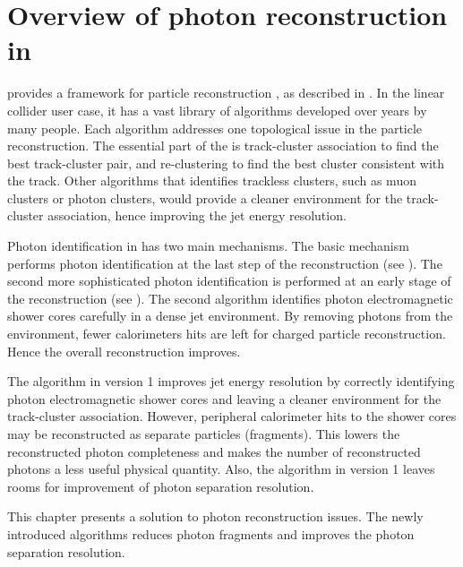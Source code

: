 
\section{Overview of photon reconstruction in \pandora}

\pandora provides a framework for particle reconstruction \cite{Marshall:2015rfa}, as described in . In the linear collider user case, it has a vast library of algorithms developed over years by many people. Each algorithm addresses one topological issue in the particle reconstruction. The essential part of the \pandora is track-cluster association  to find the best track-cluster pair, and re-clustering to find the best cluster consistent with the track. Other algorithms that identifies trackless clusters, such as muon clusters or photon clusters, would provide a cleaner environment for the track-cluster association, hence improving the jet energy resolution.

Photon identification in \pandora has two main mechanisms. The basic mechanism performs photon identification at the last step of the reconstruction  (see ). The second more sophisticated photon identification is performed at an early stage of the reconstruction  (see ). The second algorithm identifies photon electromagnetic shower cores carefully in a dense jet environment. By removing photons from the environment, fewer calorimeters hits are left for charged particle reconstruction. Hence the overall reconstruction improves.

The \PhotonReconstruction algorithm in \pandora version 1 improves jet energy resolution by correctly identifying photon electromagnetic shower cores and leaving a cleaner environment for the track-cluster association. However, peripheral calorimeter hits to the shower cores may be reconstructed as separate particles (fragments). This lowers the reconstructed photon completeness and makes the number of reconstructed photons a less useful physical quantity. Also, the algorithm in \pandora version 1 leaves rooms for improvement of photon separation resolution.

This chapter presents a solution to photon reconstruction issues. The newly introduced algorithms reduces photon fragments and improves the photon separation resolution.


